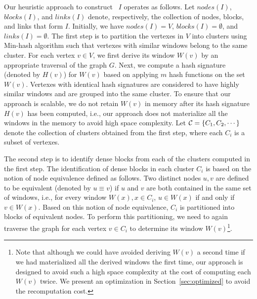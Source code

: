 Our heuristic approach to construct \DBIndex\ $I$ operates as follows.
Let $nodes(I)$, $blocks(I)$, and $links(I)$ denote, respectively,
the collection of nodes, blocks, and links that form $I$.
Initially, we have $nodes(I) = V$,
$blocks(I) = \emptyset$,
and
$links(I) = \emptyset$.
%
The first step is to partition the vertexes in $V$ into clusters
using Min-hash algorithm such that vertexes with similar windows belong to the same cluster. 
For each vertex $v \in V$, we first derive its window $W(v)$ by an appropriate traversal of the graph $G$.
Next, we compute a hash signature (denoted by $H(v)$) for $W(v)$ based on applying $m$ 
hash functions on the set $W(v)$.
Vertexes with identical hash signatures are considered 
to have highly similar windows and are grouped into the same cluster.
To ensure that our approach is scalable,
we do not retain $W(v)$ in memory after its hash signature $H(v)$ has been computed,
i.e., our approach does not materialize all the windows in the memory to avoid high space complexity.
Let ${\cal C} = \{C_1,C_2,\cdots\}$ denote the collection of clusters obtained from the first step,
where each $C_i$ is a subset of vertexes.

The second step is to identify dense blocks from each of the clusters computed in the first step.
The identification of dense blocks in each cluster $C_i$ is based on the notion of node equivalence defined as follows.
Two distinct nodes $u, v$ are defined to be equivalent (denoted by $u \equiv v$)
if $u$ and $v$ are both contained in the same set of windows,
i.e., for every window $W(x), x \in C_i$, $u \in W(x)$ if and only if $v \in W(x)$.
Based on this notion of node equivalence, $C_i$ is partitioned into blocks of equivalent nodes.
To perform this partitioning, we need to again traverse the graph for each vertex $v \in C_i$ to 
determine its window $W(v)$\footnote{
Note that although we could have avoided deriving $W(v)$ a second time if we had materialized all the derived windows the first time, our approach is designed to avoid such a high space complexity at the cost of computing each $W(v)$ twice. We present an optimization in Section~\ref{sec:optimized} to avoid the recomputation cost.
}.

